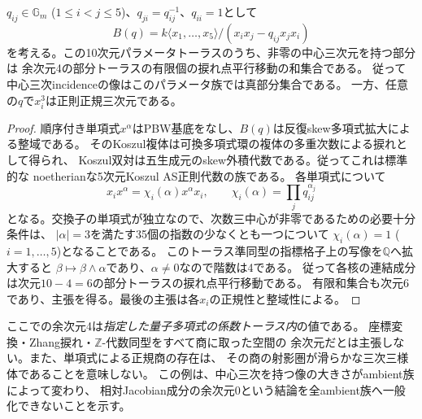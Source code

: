 \begin{proposition}[量子多項式族での正の余次元の例]
\label{prop:quantum-polynomial-central-cubic}
$q_{ij}\in\mathbb G_m$ ($1\le i<j\le5$)、$q_{ji}=q_{ij}^{-1}$、$q_{ii}=1$として
\[
 B(q)=k\langle x_1,\ldots,x_5\rangle/
 (x_ix_j-q_{ij}x_jx_i)
\]
を考える。この10次元パラメータトーラスのうち、非零の中心三次元を持つ部分は
余次元4の部分トーラスの有限個の捩れ点平行移動の和集合である。
従って中心三次incidenceの像はこのパラメータ族では真部分集合である。
一方、任意の$q$で$x_i^3$は正則正規三次元である。
\end{proposition}
\begin{proof}
順序付き単項式$x^\alpha$はPBW基底をなし、$B(q)$は反復skew多項式拡大による整域である。
そのKoszul複体は可換多項式環の複体の多重次数による捩れとして得られ、
Koszul双対は五生成元のskew外積代数である。従ってこれは標準的な
noetherianな5次元Koszul AS正則代数の族である。
各単項式について
\[
 x_i x^\alpha=\chi_i(\alpha)x^\alpha x_i,
 \qquad\chi_i(\alpha)=\prod_jq_{ij}^{\alpha_j}
\]
となる。交換子の単項式が独立なので、次数三中心が非零であるための必要十分条件は、
$|\alpha|=3$を満たす35個の指数の少なくとも一つについて
$\chi_i(\alpha)=1$ ($i=1,\ldots,5$)となることである。
このトーラス準同型の指標格子上の写像を$\mathbb Q$へ拡大すると
$\beta\mapsto\beta\wedge\alpha$であり、$\alpha\ne0$なので階数は4である。
従って各核の連結成分は次元$10-4=6$の部分トーラスの捩れ点平行移動である。
有限和集合も次元6であり、主張を得る。最後の主張は各$x_i$の正規性と整域性による。
\end{proof}

ここでの余次元4は\emph{指定した量子多項式の係数トーラス内}の値である。
座標変換・Zhang捩れ・$\mathbb Z$-代数同型をすべて商に取った空間の
余次元だとは主張しない。また、単項式による正規商の存在は、
その商の射影圏が滑らかな三次三様体であることを意味しない。
この例は、中心三次を持つ像の大きさがambient族によって変わり、
相対Jacobian成分の余次元0という結論を全ambient族へ一般化できないことを示す。
